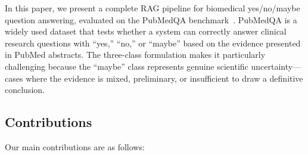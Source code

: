 \documentclass[conference]{IEEEtran}
\begin{document}
In this paper, we present a complete RAG pipeline for biomedical yes/no/maybe question answering, evaluated on the PubMedQA benchmark~\cite{jin2019pubmedqa}. PubMedQA is a widely used dataset that tests whether a system can correctly answer clinical research questions with ``yes,'' ``no,'' or ``maybe'' based on the evidence presented in PubMed abstracts. The three-class formulation makes it particularly challenging because the ``maybe'' class represents genuine scientific uncertainty---cases where the evidence is mixed, preliminary, or insufficient to draw a definitive conclusion.

\subsection{Contributions}

Our main contributions are as follows:
\end{document}
